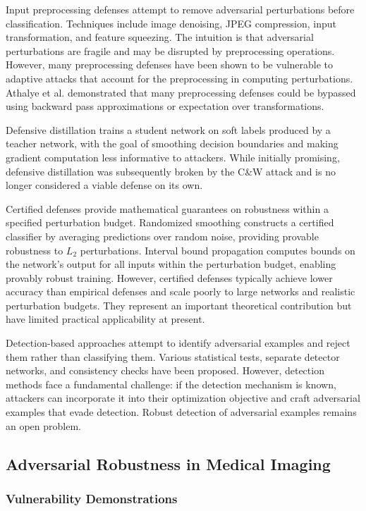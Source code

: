 \documentclass[12pt,a4paper]{article}
\begin{document}
Input preprocessing defenses attempt to remove adversarial perturbations before classification. Techniques include image denoising, JPEG compression, input transformation, and feature squeezing. The intuition is that adversarial perturbations are fragile and may be disrupted by preprocessing operations. However, many preprocessing defenses have been shown to be vulnerable to adaptive attacks that account for the preprocessing in computing perturbations. Athalye et al. \cite{athalye2018} demonstrated that many preprocessing defenses could be bypassed using backward pass approximations or expectation over transformations.

Defensive distillation trains a student network on soft labels produced by a teacher network, with the goal of smoothing decision boundaries and making gradient computation less informative to attackers. While initially promising, defensive distillation was subsequently broken by the C\&W attack and is no longer considered a viable defense on its own.

Certified defenses provide mathematical guarantees on robustness within a specified perturbation budget. Randomized smoothing constructs a certified classifier by averaging predictions over random noise, providing provable robustness to $L_2$ perturbations. Interval bound propagation computes bounds on the network's output for all inputs within the perturbation budget, enabling provably robust training. However, certified defenses typically achieve lower accuracy than empirical defenses and scale poorly to large networks and realistic perturbation budgets. They represent an important theoretical contribution but have limited practical applicability at present.

Detection-based approaches attempt to identify adversarial examples and reject them rather than classifying them. Various statistical tests, separate detector networks, and consistency checks have been proposed. However, detection methods face a fundamental challenge: if the detection mechanism is known, attackers can incorporate it into their optimization objective and craft adversarial examples that evade detection. Robust detection of adversarial examples remains an open problem.

\subsection{Adversarial Robustness in Medical Imaging}

\subsubsection{Vulnerability Demonstrations}
\end{document}
